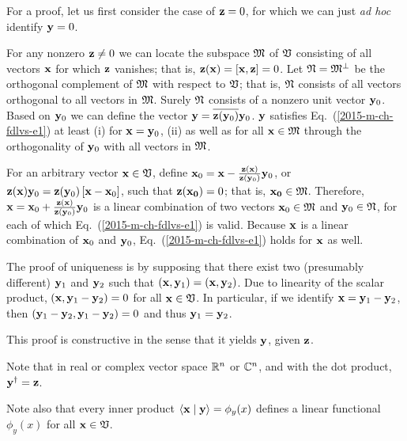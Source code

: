{\color{OliveGreen}
\bproof
For a proof, let us first consider the case
of ${\bf z} =0$, for which we can just {\it ad hoc} identify ${\bf y}=0$.

For any nonzero ${\bf z} \neq 0$ we can locate the subspace ${\frak M}$ of ${\frak V}$ consisting of all vectors ${\bf x}$ for which ${\bf z}$ vanishes;
that is, ${\bf z}({\bf x})=[{\bf x},{\bf z}]=0$.
Let  ${\frak N}={\frak M}^\perp$ be the orthogonal complement of   ${\frak M}$ with respect to ${\frak V}$; that is,  ${\frak N}$ consists of all vectors orthogonal
to all vectors in  ${\frak M}$.
Surely ${\frak N}$ consists of a nonzero unit vector ${\bf y}_0$.
Based on ${\bf y}_0$ we can define the vector ${\bf y} = \overline{{\bf z}({\bf y}_0)} {\bf y}_0$.
${\bf y}$  satisfies Eq.~(\ref{2015-m-ch-fdlvs-e1}) at least
(i)
for ${\bf x} = {\bf y}_0$,
(ii)
as well as for all ${\bf x} \in {\frak M}$
through the orthogonality of ${\bf y}_0$ with all vectors in ${\frak M}$.

For an arbitrary vector ${\bf x} \in {\frak V}$, define
${\bf x}_0 =  {\bf x} -  \frac{{\bf z}({\bf x})}{{\bf z}({\bf y}_0)}  {\bf y}_0$,
or
$ {\bf z}({\bf x})  {\bf y}_0 = {\bf z}({\bf y}_0) \left[{\bf x} - {\bf x}_0\right]$,
such that ${\bf z} ({\bf x_0})=0$; that is, ${\bf x_0} \in {\frak M}$.
Therefore,
${\bf x} =  {\bf x}_0 +  \frac{{\bf z}({\bf x})}{{\bf z}({\bf y}_0)}  {\bf y}_0$
is a linear combination of two vectors ${\bf x}_0 \in {\frak M}$ and ${\bf y}_0 \in {\frak N}$,
for each of which Eq.~(\ref{2015-m-ch-fdlvs-e1}) is valid.
Because ${\bf x}$ is a linear combination
of ${\bf x}_0$ and ${\bf y}_0$,
Eq.~(\ref{2015-m-ch-fdlvs-e1}) holds for ${\bf x}$ as well.

The proof of uniqueness is by supposing
that there exist two (presumably different) ${\bf y}_1$ and ${\bf y}_2$
such that
$
({\bf x},{\bf y}_1)
=
({\bf x},{\bf y}_2)
$.
Due to linearity of the scalar product,
$
({\bf x},{\bf y}_1-{\bf y}_2) =0
$ for all ${\bf x} \in {\frak V}$.
In particular, if we identify
${\bf x}={\bf y}_1-{\bf y}_2$,
then
$
({\bf y}_1-{\bf y}_2,{\bf y}_1-{\bf y}_2) =0
$
and thus ${\bf y}_1={\bf y}_2$.

This proof is constructive in the sense that it yields ${\bf y}$, given ${\bf z}$.
\eproof
}



Note that in  real or complex vector space ${\Bbb R}^n$ or ${\Bbb C}^n$, and with the dot product,
 ${\bf y}^\dagger = {\bf z}$.

Note also that every inner product
$\langle {\bf x}\mid {\bf y}\rangle = \phi_y(x)$ defines a linear
functional $\phi_y(x)$ for all ${\bf x}\in {\frak V}$.




